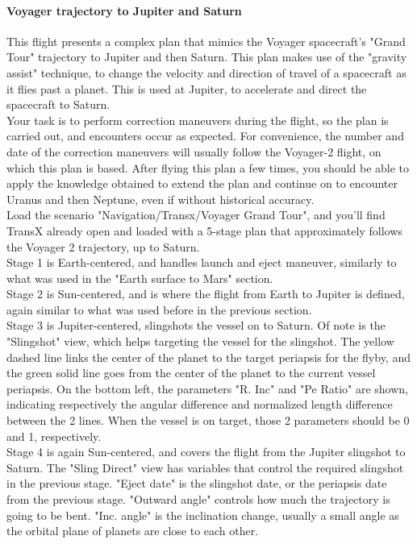 \documentclass[Orbiter User Manual.tex]{subfiles}
\begin{document}
\paragraph{Voyager trajectory to Jupiter and Saturn}
This flight presents a complex plan that mimics the Voyager spacecraft's "Grand Tour" trajectory to Jupiter and then Saturn. This plan makes use of the "gravity assist" technique, to change the velocity and direction of travel of a spacecraft as it flies past a planet. This is used at Jupiter, to accelerate and direct the spacecraft to Saturn.\\
Your task is to perform correction maneuvers during the flight, so the plan is carried out, and encounters occur as expected. For convenience, the number and date of the correction maneuvers will usually follow the Voyager-2 flight, on which this plan is based. After flying this plan a few times, you should be able to apply the knowledge obtained to extend the plan and continue on to encounter Uranus and then Neptune, even if without historical accuracy.\\
Load the scenario "Navigation/Transx/Voyager Grand Tour", and you'll find TransX already open and loaded with a 5-stage plan that approximately follows the Voyager 2 trajectory, up to Saturn.\\
Stage 1 is Earth-centered, and handles launch and eject maneuver, similarly to what was used in the "Earth surface to Mars" section.\\
Stage 2 is Sun-centered, and is where the flight from Earth to Jupiter is defined, again similar to what was used before in the previous section.\\
Stage 3 is Jupiter-centered, slingshots the vessel on to Saturn. Of note is the "Slingshot" view, which helps targeting the vessel for the slingshot. The yellow dashed line links the center of the planet to the target periapsis for the flyby, and the green solid line goes from the center of the planet to the current vessel periapsis. On the bottom left, the parameters "R. Inc" and "Pe Ratio" are shown, indicating respectively the angular difference and normalized length difference between the 2 lines. When the vessel is on target, those 2 parameters should be 0 and 1, respectively.\\
Stage 4 is again Sun-centered, and covers the flight from the Jupiter slingshot to Saturn. The "Sling Direct" view has variables that control the required slingshot in the previous stage. "Eject date" is the slingshot date, or the periapsis date from the previous stage. "Outward angle" controls how much the trajectory is going to be bent. "Inc. angle" is the inclination change, usually a small angle as the orbital plane of planets are close to each other.\\
\end{document}
